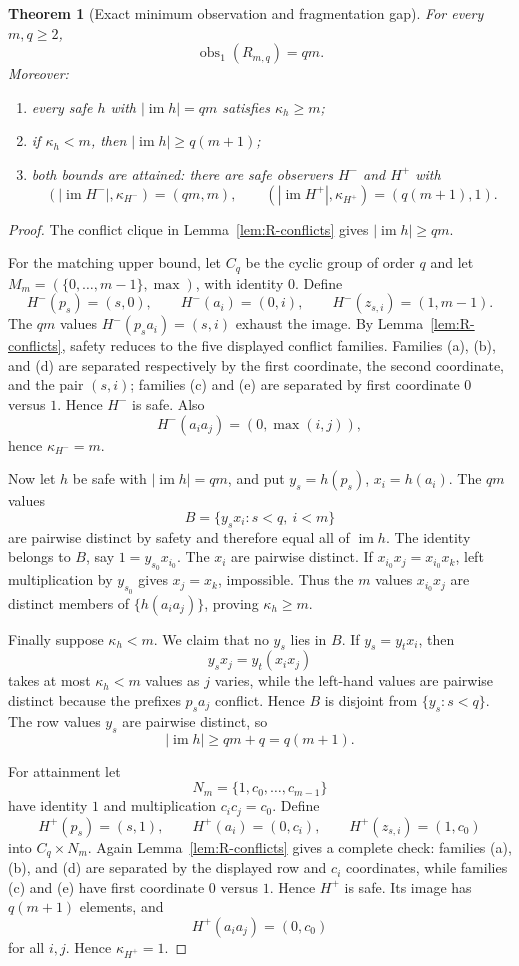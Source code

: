 \documentclass[11pt]{article}
\newtheorem{theorem}{Theorem}[section]
\theoremstyle{definition}
\theoremstyle{remark}
\newcommand{\im}{\operatorname{im}}
\newcommand{\obs}{\operatorname{obs}}
\begin{document}
\begin{theorem}[Exact minimum observation and fragmentation gap]
\label{thm:R-observation}
For every \(m,q\ge2\),
\[
 \obs_1(R_{m,q})=qm.
\]
Moreover:
\begin{enumerate}[label=(\roman*),leftmargin=*]
\item every safe \(h\) with \(|\im h|=qm\) satisfies \(\kappa_h\ge m\);
\item if \(\kappa_h<m\), then \(|\im h|\ge q(m+1)\);
\item both bounds are attained: there are safe observers \(H^-\) and \(H^+\)
with
\[
 (|\im H^-|,\kappa_{H^-})=(qm,m),
 \qquad
 (|\im H^+|,\kappa_{H^+})=(q(m+1),1).
\]
\end{enumerate}
\end{theorem}

\begin{proof}
The conflict clique in Lemma~\ref{lem:R-conflicts} gives
\(|\im h|\ge qm\).

For the matching upper bound, let \(C_q\) be the cyclic group of order \(q\)
and let \(M_m=(\{0,\ldots,m-1\},\max)\), with identity \(0\).  Define
\[
 H^-(p_s)=(s,0),\qquad
 H^-(a_i)=(0,i),\qquad
 H^-(z_{s,i})=(1,m-1).
\]
The \(qm\) values \(H^-(p_sa_i)=(s,i)\) exhaust the image.  By
Lemma~\ref{lem:R-conflicts}, safety reduces to the five displayed conflict
families.  Families (a), (b), and (d) are separated respectively by the first
coordinate, the second coordinate, and the pair \((s,i)\); families (c) and
(e) are separated by first coordinate \(0\) versus \(1\).  Hence \(H^-\) is
safe.  Also
\[
 H^-(a_i a_j)=(0,\max(i,j)),
\]
hence \(\kappa_{H^-}=m\).

Now let \(h\) be safe with \(|\im h|=qm\), and put
\(y_s=h(p_s)\), \(x_i=h(a_i)\).  The \(qm\) values
\[
 B=\{y_sx_i:s<q,\ i<m\}
\]
are pairwise distinct by safety and therefore equal all of \(\im h\).
The identity belongs to \(B\), say \(1=y_{s_0}x_{i_0}\).
The \(x_i\) are pairwise distinct.  If
\(x_{i_0}x_j=x_{i_0}x_k\), left multiplication by \(y_{s_0}\) gives
\(x_j=x_k\), impossible.  Thus the \(m\) values
\(x_{i_0}x_j\) are distinct members of
\(\{h(a_i a_j)\}\), proving \(\kappa_h\ge m\).

Finally suppose \(\kappa_h<m\).  We claim that no \(y_s\) lies in \(B\).
If \(y_s=y_tx_i\), then
\[
 y_sx_j=y_t(x_ix_j)
\]
takes at most \(\kappa_h<m\) values as \(j\) varies, while the left-hand
values are pairwise distinct because the prefixes \(p_sa_j\) conflict.
Hence \(B\) is disjoint from \(\{y_s:s<q\}\).  The row values \(y_s\) are
pairwise distinct, so
\[
 |\im h|\ge qm+q=q(m+1).
\]

For attainment let
\[
 N_m=\{1,c_0,\ldots,c_{m-1}\}
\]
have identity \(1\) and multiplication \(c_ic_j=c_0\).  Define
\[
 H^+(p_s)=(s,1),\qquad
 H^+(a_i)=(0,c_i),\qquad
 H^+(z_{s,i})=(1,c_0)
\]
into \(C_q\times N_m\).  Again Lemma~\ref{lem:R-conflicts} gives a complete check: families (a), (b),
and (d) are separated by the displayed row and \(c_i\) coordinates, while
families (c) and (e) have first coordinate \(0\) versus \(1\).  Hence
\(H^+\) is safe.  Its image has \(q(m+1)\) elements, and
\[
 H^+(a_i a_j)=(0,c_0)
\]
for all \(i,j\).  Hence \(\kappa_{H^+}=1\).
\end{proof}
\end{document}
